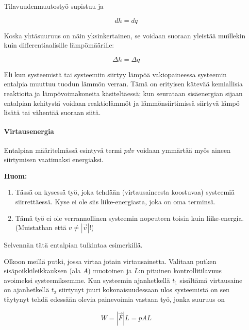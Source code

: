 \documentclass[12pt,a4paper,finnish]{book}
\begin{document}
Tilavuudenmuutostyö supistuu ja

\begin{equation}
 dh = dq
\end{equation}

Koska yhtäsuuruus on näin yksinkertainen, se voidaan suoraan yleistää muillekin kuin differentiaalisille lämpömäärille:

\begin{equation}
 \Delta h = \Delta q
\end{equation}

Eli kun systeemistä tai systeemiin siirtyy lämpöä vakiopaineessa systeemin entalpia muuttuu tuodun lämmön verran. Tämä 
on erityisen kätevää kemiallisia reaktioita ja lämpövoimakoneita käsiteltäessä; kun seurataan sisäenergian sijaan 
entalpian kehitystä voidaan reaktiolämmöt ja lämmönsiirtimissä siirtyvä lämpö lisätä tai vähentää suoraan siitä.

\paragraph{Virtausenergia}

Entalpian määritelmässä esintyvä termi $pdv$ voidaan ymmärtää myös aineen siirtymisen vaatimaksi energiaksi. 

\textbf{Huom:}

\begin{enumerate}
 \item Tässä on kysessä työ, joka tehdään (virtausaineesta koostuvaa) systeemiä siirrettäessä. Kyse ei ole siis liike-energiasta, 
  joka on oma terminsä.
 \item Tämä työ ei ole verrannollinen systeemin nopeuteen toisin kuin liike-energia. (Muistathan että $v \neq \left|\vec{v}\right|$!)
\end{enumerate}

Selvennän tätä entalpian tulkintaa esimerkillä.

Olkoon meillä putki, jossa virtaa jotain virtausainetta. Valitaan putken sisäpoikkileikkauksen (ala $A$) muotoinen ja $L$:n 
pituinen kontrollitilavuus avoimeksi systeemiksemme. Kun systeemin ajanhetkellä $t_1$ sisältämä virtausaine on 
ajanhetkellä $t_2$ siirtynyt juuri kokonaisuudessaan ulos systeemistä on sen täytynyt tehdä edessään olevia 
painevoimia vastaan työ, jonka suuruus on

\begin{equation}
 W = |\vec{F}| L = pAL
\end{equation}
\end{document}
